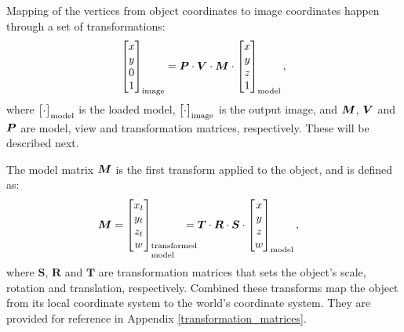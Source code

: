 Mapping of the vertices from object coordinates to image coordinates happen through a set of transformations:
%
\begin{align*}
\bmat{x\\y\\0\\1}_\text{image} = \boldsymbol{P} \cdot \boldsymbol{V} \cdot \boldsymbol{M} \cdot \bmat{x\\y\\z\\1}_\text{model},
\end{align*}
%
where $\bmat{\cdot}_\text{model}$ is the loaded model, $\bmat{\cdot}_\text{image}$ is the output image, and $\M$, $\V$ and $\P$ are model, view and transformation matrices, respectively. These will be described next.

The model matrix $\M$ is the first transform applied to the object, and is defined as:
%
\begin{align}
\M = \bmat{x_t \\ y_t \\ z_t \\ w}_\text{\parbox{1cm}{\setlength\baselineskip{0.3cm}transformed\\model}} &= \boldsymbol{T} \cdot \boldsymbol{R} \cdot \boldsymbol{S} \cdot \bmat{x \\ y \\ z \\ w}_\text{model},
\end{align}
%
where $\boldsymbol{S}$, $\boldsymbol{R}$ and $\boldsymbol{T}$ are transformation matrices that sets the object's scale, rotation and translation, respectively. Combined these transforms map the object from its local coordinate system to the world's coordinate system. They are provided for reference in Appendix \ref{transformation_matrices}.

